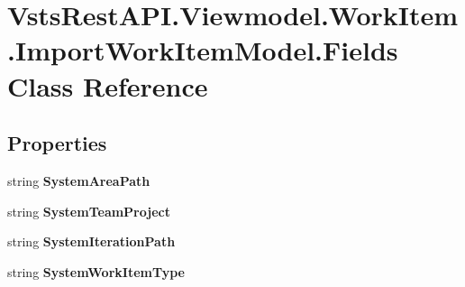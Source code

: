 \hypertarget{class_vsts_rest_a_p_i_1_1_viewmodel_1_1_work_item_1_1_import_work_item_model_1_1_fields}{}\section{Vsts\+Rest\+A\+P\+I.\+Viewmodel.\+Work\+Item.\+Import\+Work\+Item\+Model.\+Fields Class Reference}
\label{class_vsts_rest_a_p_i_1_1_viewmodel_1_1_work_item_1_1_import_work_item_model_1_1_fields}
\subsection*{Properties}
\begin{DoxyCompactItemize}
\item 
\mbox{\label{class_vsts_rest_a_p_i_1_1_viewmodel_1_1_work_item_1_1_import_work_item_model_1_1_fields_a09432a150c5c2f3b5fc6dd7216fee2f5}} 
string {\bfseries System\+Area\+Path}
\item 
\mbox{\label{class_vsts_rest_a_p_i_1_1_viewmodel_1_1_work_item_1_1_import_work_item_model_1_1_fields_acea4c9dc3fbfa1b10949e2b71f0ae587}} 
string {\bfseries System\+Team\+Project}
\item 
\mbox{\label{class_vsts_rest_a_p_i_1_1_viewmodel_1_1_work_item_1_1_import_work_item_model_1_1_fields_a2fab0c90785b30d9be2cbf7b3b182b95}} 
string {\bfseries System\+Iteration\+Path}
\item 
\mbox{\label{class_vsts_rest_a_p_i_1_1_viewmodel_1_1_work_item_1_1_import_work_item_model_1_1_fields_ac52b20d6204ce2459d7f457381913da9}} 
string {\bfseries System\+Work\+Item\+Type}

\end{DoxyCompactItemize}
